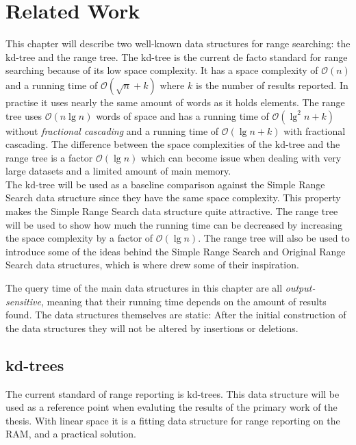 \chapter{Related Work}
\label{ch:relatedwork}

This chapter will describe two well-known data structures for range searching: the kd-tree and the range tree. The kd-tree is the current de facto standard for range searching because of its low space complexity. It has a space complexity of $\mathcal{O}(n)$ and a running time of $\mathcal{O}(\sqrt{n} + k)$ where $k$ is the number of results reported. In practise it uses nearly the same amount of words as it holds elements. The range tree uses $\mathcal{O}(n \lg n)$ words of space and has a running time of $\mathcal{O}(\lg^2 n + k)$ without \emph{fractional cascading} and a running time of $\mathcal{O}(\lg n + k)$ with fractional cascading. The difference between the space complexities of the kd-tree and the range tree is a factor $\mathcal{O}(\lg n)$ which can become issue when dealing with very large datasets and a limited amount of main memory.\\

The kd-tree will be used as a baseline  comparison against the Simple Range Search data structure since they have the same space complexity. This property makes the Simple Range Search data structure quite attractive. The range tree will be used to show how much the running time can be decreased by increasing the space complexity by a factor of $\mathcal{O}(\lg n)$. The range tree will also be used to introduce some of the ideas behind the Simple Range Search and Original Range Search data structures, which is where \citet{chanetal} drew some of their inspiration.

The query time of the main data structures in this chapter are all \emph{output-sensitive}, meaning that their running time depends on the amount of results found. The data structures themselves are static: After the initial construction of the data structures they will not be altered by insertions or deletions.  

\section{kd-trees}
\label{sect:kdtrees}

The current standard of range reporting is kd-trees. This data structure will be used as a reference point when evaluting the results of the primary work of the thesis. With linear space it is a fitting data structure for range reporting on the RAM, and a practical solution.

